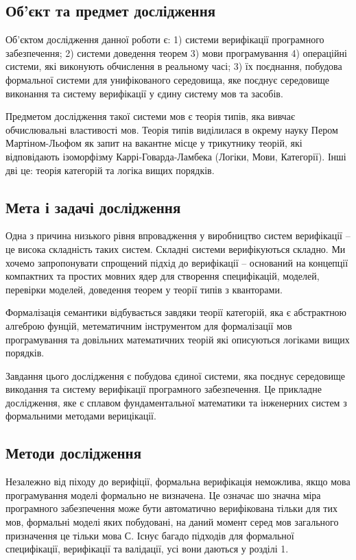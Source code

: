\subsection*{Об'єкт та предмет дослідження}
Об'єктом дослідження данної роботи є: 1) системи верифікації
програмного забезпечення; 2) системи доведення теорем 3) мови програмування
4) операційні системи, які виконують
обчислення в реальному часі; 3) їх поєднання, побудова формальної системи для
унифікованого середовища, яке поєднує середовище виконання та систему
верифікації у єдину систему мов та засобів.

Предметом дослідження такої системи мов є теорія типів, яка вивчає обчислювальні властивості мов.
Теорія типів виділилася в окрему науку Пером Мартіном-Льофом як запит на вакантне місце у
трикутнику теорій, які відповідають ізоморфізму Каррі-Говарда-Ламбека (Логіки, Мови, Категорії).
Інші дві це: теорія категорій та логіка вищих порядків.

\subsection*{Мета і задачі дослідження}
Одна з причина низького рівня впровадження у виробництво систем
верифікації -- це висока складність таких систем. Складні системи
верифікуються складно. Ми хочемо запропонувати спрощений
підхід до верифікації -- оснований на концепції компактних
та простих мовних ядер для створення специфікацій, моделей,
перевірки моделей, доведення теорем у теорії типів з кванторами.

Формалізація семантики відбувається завдяки теорії категорій,
яка є абстрактною алгеброю фунцій, метематичним інструментом
для формалізації мов програмування та довільних
математичних теорій які описуються логіками вищих порядків.

Завдання цього дослідження є побудова єдиної системи, яка поєднує середовище
викодання та систему верифікації програмного забезпечення. Це прикладне дослідження,
яке є сплавом фундаментальної математики та інженерних
систем з формальними методами верицікації.

\subsection*{Методи дослідження}

Незалежно від піходу до верифіції, формальна верифікація неможлива,
якщо мова програмування моделі формально не визначена. Це означає шо значна міра
програмного забезпечення може бути автоматично верифікована тільки для тих мов,
формальні моделі яких побудовані, на даний момент серед мов загального призначення
це тільки мова С. Існує багадо підходів для формальної специфікації,
верифікації та валідації, усі вони даються у розділі 1.


